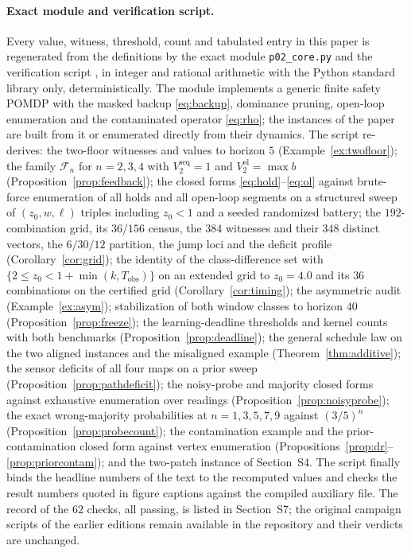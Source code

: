 \documentclass[11pt,a4paper]{article}
\theoremstyle{plain}
\theoremstyle{definition}
\theoremstyle{remark}
\newcommand{\ol}{\mathrm{ol}}
\newcommand{\seq}{\mathrm{seq}}
\newcommand{\Tobs}{T_{\mathrm{obs}}}
\begin{document}
\paragraph{Exact module and verification script.}
Every value, witness, threshold, count and tabulated entry in this paper is regenerated from the definitions by the exact module \texttt{p02\_core.py} and the verification script , in integer and rational arithmetic with the Python standard library only, deterministically. The module implements a generic finite safety POMDP with the masked backup \eqref{eq:backup}, dominance pruning, open-loop enumeration and the contaminated operator \eqref{eq:rho}; the instances of the paper are built from it or enumerated directly from their dynamics. The script re-derives: the two-floor witnesses and values to horizon $5$ (Example~\ref{ex:twofloor}); the family $\mathcal F_n$ for $n=2,3,4$ with $V^{\seq}_2=1$ and $V^{\ol}_2=\max b$ (Proposition~\ref{prop:feedback}); the closed forms \eqref{eq:hold}--\eqref{eq:ol} against brute-force enumeration of all holds and all open-loop segments on a structured sweep of $(z_0,w,\ell)$ triples including $z_0<1$ and a seeded randomized battery; the $192$-combination grid, its $36/156$ census, the $384$ witnesses and their $348$ distinct vectors, the $6/30/12$ partition, the jump loci and the deficit profile (Corollary~\ref{cor:grid}); the identity of the class-difference set with $\{2\le z_0<1+\min(k,\Tobs)\}$ on an extended grid to $z_0=4.0$ and its $36$ combinations on the certified grid (Corollary~\ref{cor:timing}); the asymmetric audit (Example~\ref{ex:asym}); stabilization of both window classes to horizon $40$ (Proposition~\ref{prop:freeze}); the learning-deadline thresholds and kernel counts with both benchmarks (Proposition~\ref{prop:deadline}); the general schedule law on the two aligned instances and the misaligned example (Theorem~\ref{thm:additive}); the sensor deficits of all four maps on a prior sweep (Proposition~\ref{prop:pathdeficit}); the noisy-probe and majority closed forms against exhaustive enumeration over readings (Proposition~\ref{prop:noisyprobe}); the exact wrong-majority probabilities at $n=1,3,5,7,9$ against $(3/5)^{n}$ (Proposition~\ref{prop:probecount}); the contamination example and the prior-contamination closed form against vertex enumeration (Propositions~\ref{prop:dr}--\ref{prop:priorcontam}); and the two-patch instance of Section~S4. The script finally binds the headline numbers of the text to the recomputed values and checks the result numbers quoted in figure captions against the compiled auxiliary file. The record of the $62$ checks, all passing, is listed in Section~S7; the original campaign scripts of the earlier editions remain available in the repository and their verdicts are unchanged.
\end{document}
